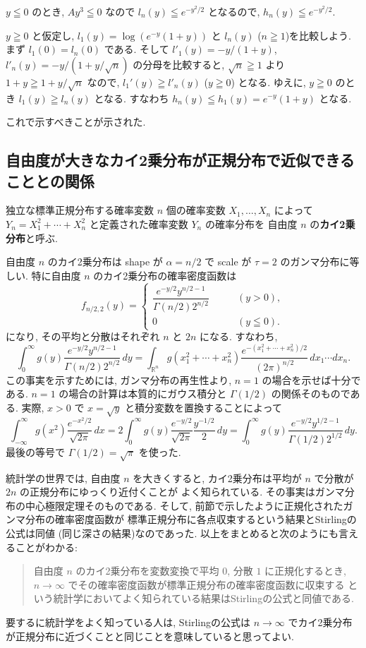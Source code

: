 \documentclass[12pt,twoside]{jarticle}
\newcommand\R{{\mathbb R}} %
\theoremstyle{jplain}
\theoremstyle{jplain}
\theoremstyle{jplain}
\numberwithin{theorem}{section}
\numberwithin{equation}{section}
\numberwithin{figure}{section}
\numberwithin{table}{section}
\begin{document}
$y\leqq 0$ のとき, 
$Ay^3\leqq 0$ なので $l_n(y)\leqq e^{-y^2/2}$ となるので, 
$h_n(y)\leqq e^{-y^2/2}$.

$y\geqq 0$ と仮定し, $l_1(y)=\log(e^{-y}(1+y))$ と $l_n(y)$ ($n\geqq 1$)を比較しよう.
まず $l_1(0)=l_n(0)$ である. 
そして $l'_1(y)=-y/(1+y)$, $l'_n(y)=-y/(1+y/\sqrt{n})$
の分母を比較すると, 
$\sqrt{n}\geqq 1$ より $1+y\geqq 1+y/\sqrt{n}$ なので,
$l_1'(y)\geqq l'_n(y)$ ($y\geqq 0$) となる.
ゆえに, $y\geqq 0$ のとき $l_1(y)\geqq l_n(y)$ となる.
すなわち $h_n(y)\leqq h_1(y)=e^{-y}(1+y)$ となる. 

これで示すべきことが示された.


\subsection{自由度が大きなカイ2乗分布が正規分布で近似できることとの関係}

独立な標準正規分布する確率変数 $n$ 個の確率変数 $X_1,\ldots,X_n$
によって $Y_n=X_1^2+\cdots+X_n^2$ と定義された確率変数 $Y_n$ の確率分布を
自由度 $n$ の{\bf カイ2乗分布}と呼ぶ.

自由度 $n$ のカイ2乗分布は
shape が $\alpha=n/2$ で scale が $\tau=2$ のガンマ分布に等しい.
特に自由度 $n$ のカイ2乗分布の確率密度函数は
\[
f_{n/2,2}(y) =
\begin{cases}
\dfrac{e^{-y/2}y^{n/2-1}}{\Gamma(n/2)2^{n/2}} & \qquad (y>0), \\
0 & \qquad (y\leqq 0).
\end{cases}
\]
になり, その平均と分散はそれぞれ $n$ と $2n$ になる. すなわち,
\[
\int_0^\infty g(y) \frac{e^{-y/2}y^{n/2-1}}{\Gamma(n/2)2^{n/2}}\,dy
=\int_{\R^n} g(x_1^2+\cdots+x_n^2) \frac{e^{-(x_1^2+\cdots+x_n^2)/2}}{(2\pi)^{n/2}}\,dx_1\cdots dx_n.
\]
この事実を示すためには, ガンマ分布の再生性より, $n=1$ の場合を示せば十分である.
$n=1$ の場合の計算は本質的にガウス積分と $\Gamma(1/2)$ の関係そのものである.
実際, $x>0$ で $x=\sqrt{y}$ と積分変数を置換することによって
\[
\int_{-\infty}^\infty g(x^2)\frac{e^{-x^2/2}}{\sqrt{2\pi}}\,dx
=2\int_0^\infty g(y) \frac{e^{-y/2}}{\sqrt{2\pi}}\frac{y^{-1/2}}{2}\,dy
=\int_0^\infty g(y)\frac{e^{-y/2}y^{1/2-1}}{\Gamma(1/2)2^{1/2}}\,dy.
\]
最後の等号で $\Gamma(1/2)=\sqrt{\pi}$ を使った.

統計学の世界では, 自由度 $n$ を大きくすると, 
カイ2乗分布は平均が $n$ で分散が $2n$ の正規分布にゆっくり近付くことが
よく知られている. 
その事実はガンマ分布の中心極限定理そのものである.
そして, 前節で示したように正規化されたガンマ分布の確率密度函数が
標準正規分布に各点収束するという結果とStirlingの公式は同値
(同じ深さの結果)なのであった.
以上をまとめると次のようにも言えることがわかる:
\begin{quote}
自由度 $n$ のカイ2乗分布を変数変換で平均 $0$, 分散 $1$ に正規化するとき,
$n\to\infty$ でその確率密度函数が標準正規分布の確率密度函数に収束する
という統計学においてよく知られている結果はStirlingの公式と同値である.
\end{quote}
要するに統計学をよく知っている人は, Stirlingの公式は
$n\to\infty$ でカイ2乗分布が正規分布に近づくことと同じことを意味していると思ってよい.
\end{document}
